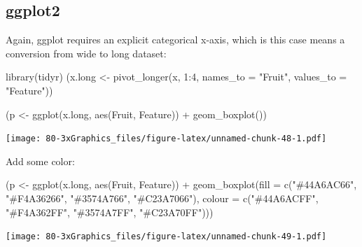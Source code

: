\documentclass[
]{book}
\newenvironment{Shaded}{\begin{snugshade}}{\end{snugshade}}
\newcommand{\AttributeTok}[1]{\textcolor[rgb]{0.77,0.63,0.00}{#1}}
\newcommand{\DecValTok}[1]{\textcolor[rgb]{0.00,0.00,0.81}{#1}}
\newcommand{\FunctionTok}[1]{\textcolor[rgb]{0.00,0.00,0.00}{#1}}
\newcommand{\NormalTok}[1]{#1}
\newcommand{\OtherTok}[1]{\textcolor[rgb]{0.56,0.35,0.01}{#1}}
\newcommand{\SpecialCharTok}[1]{\textcolor[rgb]{0.00,0.00,0.00}{#1}}
\newcommand{\StringTok}[1]{\textcolor[rgb]{0.31,0.60,0.02}{#1}}
\begin{document}
\hypertarget{ggplot2-6}{%
\subsection{\texorpdfstring{\textbf{ggplot2}}{ggplot2}}\label{ggplot2-6}}

Again, ggplot requires an explicit categorical x-axis, which is this case means a conversion from wide to long dataset:

\begin{Shaded}
\begin{Highlighting}[]
\FunctionTok{library}\NormalTok{(tidyr)}
\NormalTok{(x.long }\OtherTok{\textless{}{-}} \FunctionTok{pivot\_longer}\NormalTok{(x, }\DecValTok{1}\SpecialCharTok{:}\DecValTok{4}\NormalTok{, }\AttributeTok{names\_to =} \StringTok{"Fruit"}\NormalTok{, }\AttributeTok{values\_to =} \StringTok{"Feature"}\NormalTok{))}
\end{Highlighting}
\end{Shaded}

\begin{Shaded}
\begin{Highlighting}[]
\NormalTok{(p }\OtherTok{\textless{}{-}} \FunctionTok{ggplot}\NormalTok{(x.long, }\FunctionTok{aes}\NormalTok{(Fruit, Feature)) }\SpecialCharTok{+} \FunctionTok{geom\_boxplot}\NormalTok{())}
\end{Highlighting}
\end{Shaded}

\texttt{[image: 80-3xGraphics\_files/figure-latex/unnamed-chunk-48-1.pdf]}

Add some color:

\begin{Shaded}
\begin{Highlighting}[]
\NormalTok{(p }\OtherTok{\textless{}{-}} \FunctionTok{ggplot}\NormalTok{(x.long, }\FunctionTok{aes}\NormalTok{(Fruit, Feature)) }\SpecialCharTok{+}
   \FunctionTok{geom\_boxplot}\NormalTok{(}\AttributeTok{fill =} \FunctionTok{c}\NormalTok{(}\StringTok{"\#44A6AC66"}\NormalTok{, }\StringTok{"\#F4A36266"}\NormalTok{, }\StringTok{"\#3574A766"}\NormalTok{, }\StringTok{"\#C23A7066"}\NormalTok{),}
                \AttributeTok{colour =} \FunctionTok{c}\NormalTok{(}\StringTok{"\#44A6ACFF"}\NormalTok{, }\StringTok{"\#F4A362FF"}\NormalTok{, }\StringTok{"\#3574A7FF"}\NormalTok{, }\StringTok{"\#C23A70FF"}\NormalTok{)))}
\end{Highlighting}
\end{Shaded}

\texttt{[image: 80-3xGraphics\_files/figure-latex/unnamed-chunk-49-1.pdf]}
\end{document}
